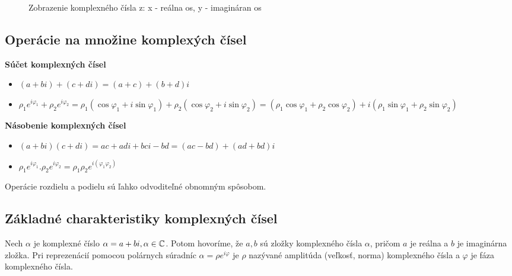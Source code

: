 \begin{figure}
\centering
{}
\caption{Zobrazenie komplexného čísla z: x - reálna os, y - imagináran os}
\label{fig:kn}
\end{figure}

\subsection{Operácie na množine komplexých čísel}
\textbf{Súčet komplexných čísel}
\begin{itemize}
\item \((a + bi) + (c + di) = (a + c) + (b + d)i\)
\item \(\rho_{1}e^{i \varphi_{1}} + \rho_{2}e^{i \varphi_{2}} = \rho_{1}(\cos \varphi_{1} + i\sin \varphi_{1}) + \rho_{2}(\cos \varphi_{2} + i\sin \varphi_{2}) =  (\rho_{1}\cos \varphi_{1} + \rho_{2}\cos \varphi_{2}) + i(\rho_{1}\sin \varphi_{1} + \rho_{2}\sin \varphi_{2})\)
\end{itemize}

\textbf{Násobenie komplexných čísel}
\begin{itemize}
\item \((a + bi)(c + di) = ac + adi + bci - bd = (ac - bd) + (ad + bd)i\)
\item \(\rho_{1}e^{i \varphi_{1}} . \rho_{2}e^{i \varphi_{2}} = \rho_{1} \rho_{2}e^{i(\varphi_{1} \varphi_{2})}\)
\end{itemize}

Operácie rozdielu a podielu sú ľahko odvoditeľné obnomným spôsobom.

\subsection{Základné charakteristiky komplexných čísel}
Nech \(\alpha\) je komplexné číslo \(\alpha = a + bi, \alpha \in \mathbb{C}\).
Potom hovoríme, že \(a,b\) sú zložky komplexného čísla \(\alpha\), pričom \(a\) je reálna a \(b\) je imaginárna zložka.
Pri reprezenácií pomocou polárnych súradníc \(\alpha = \rho e^{i\varphi}\) je \(\rho\) nazývané amplitúda (veľkosť, norma) komplexného čísla a \(\varphi\) je fáza komplexného čísla. \\

